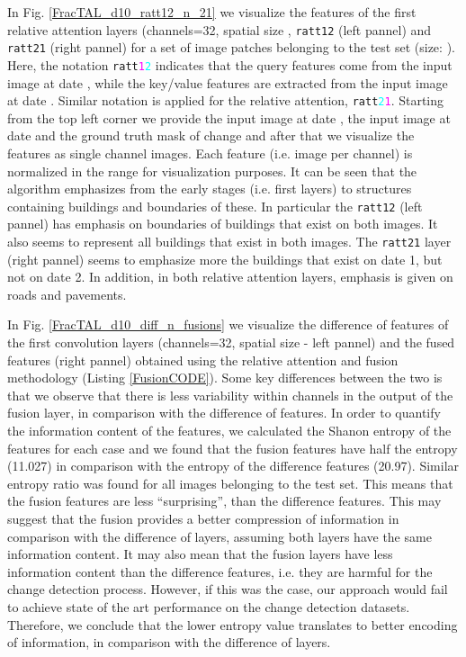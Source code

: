 \documentclass[times, 5p]{elsarticle}
\begin{document}
In Fig. \ref{FracTAL_d10_ratt12_n_21}  we visualize the features of the first relative attention layers (channels=32, spatial size , \texttt{ratt12} (left pannel) and \texttt{ratt21} (right pannel) for a set of image patches belonging to the test set (size: ).
Here, the notation 
\texttt{ratt\textcolor{magenta}{1}\textcolor{cyan}{2}} indicates that the query features come from the input image at date , while the key/value features are extracted from the input image at date . Similar notation is applied for the relative attention,  \texttt{ratt\textcolor{cyan}{2}\textcolor{magenta}{1}}.
 Starting from the top left corner we provide the input image at date , the input image at date  and the ground truth mask of change and after that we visualize the features as single channel images. 
Each feature (i.e. image per channel)  is normalized in the range  for visualization purposes. 
It can be seen that the algorithm emphasizes from the early stages (i.e. first layers) to structures containing buildings and boundaries of these. In particular the \texttt{ratt12} (left pannel) has emphasis on boundaries of buildings that exist on both images. It also seems to represent all buildings that exist in both images. The \texttt{ratt21} layer (right pannel) seems to emphasize more the buildings that exist on date 1, but not on date 2. In addition, in both relative attention layers, emphasis is given on roads and pavements.


In Fig. \ref{FracTAL_d10_diff_n_fusions} we visualize the difference of features of the first convolution layers (channels=32, spatial size  - left pannel) and the fused features (right pannel) obtained using the relative attention and fusion methodology (Listing \ref{FusionCODE}). Some key differences between the two is that we observe that there is less variability within channels in the output of the fusion layer, 
in comparison with the difference of features. 
 In order to quantify the information content of the features,  
we calculated the Shanon entropy of the features for each case and we found that the fusion features have half the entropy (11.027) in comparison with the entropy of the difference features (20.97). Similar entropy ratio was found for all images belonging to the test set. This means that the fusion features are less ``surprising'', than the difference features. This may suggest that the fusion provides a better compression of information in comparison with the difference of layers, assuming both layers have the same information content. It may also mean that the fusion layers have less information content than the difference features, i.e. they are harmful for the change detection process. However, if  this was the case, our approach would fail to achieve state of the art performance on the change detection datasets. Therefore, we conclude that the lower entropy value translates to better encoding of information, in comparison with the difference of layers. 
\end{document}
